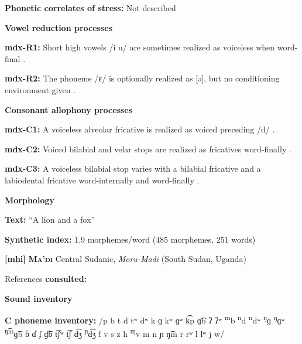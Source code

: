 \textbf{Phonetic correlates of stress:} Not described



\textbf{Vowel reduction processes}



\textbf{mdx-R1:} Short high vowels /i u/ are sometimes realized as voiceless when word-final \citep[35-6]{Beachy2005}.



\textbf{mdx-R2:} The phoneme /ɛ/ is optionally realized as [ə], but no conditioning environment given \citep[37]{Beachy2005}.



\textbf{Consonant allophony processes}



\textbf{mdx-C1:} A voiceless alveolar fricative is realized as voiced preceding /d/ \citep[26]{Beachy2005}.



\textbf{mdx-C2:} Voiced bilabial and velar stops are realized as fricatives word-finally \citep[17]{Beachy2005}.



\textbf{mdx-C3:} A voiceless bilabial stop varies with a bilabial fricative and a labiodental fricative word-internally and word-finally \citep[17]{Beachy2005}.



\textbf{Morphology}



\textbf{Text:} “A lion and a fox” \citep[154-158]{Beachy2005}



\textbf{Synthetic index:} 1.9 morphemes/word (485 morphemes, 251 words)



\textbf{[mhi]}   \textbf{\textsc{Ma’di}}  Central Sudanic, \textit{Moru-Madi} (South Sudan, Uganda)



References \textbf{consulted:} \citet{BlackingsFabb2003}



\textbf{Sound inventory}



\textbf{C phoneme inventory:} /p b t d tʷ dʷ k ɡ kʷ ɡʷ k͡p ɡ͡b ʔ ʔʷ \textsuperscript{m}b \textsuperscript{n}d \textsuperscript{n}dʷ \textsuperscript{ŋ}ɡ \textsuperscript{ŋ}ɡʷ \textsuperscript{ŋ͡m}ɡ͡b ɓ ɗ ʄ ɠ͡ɓ t͡ʃʷ t͡ʃ d͡ʒ \textsuperscript{ɲ}d͡ʒ f v s z h \textsuperscript{ɱ}v m n ɲ ŋ͡m r rʷ l lʷ j w/



